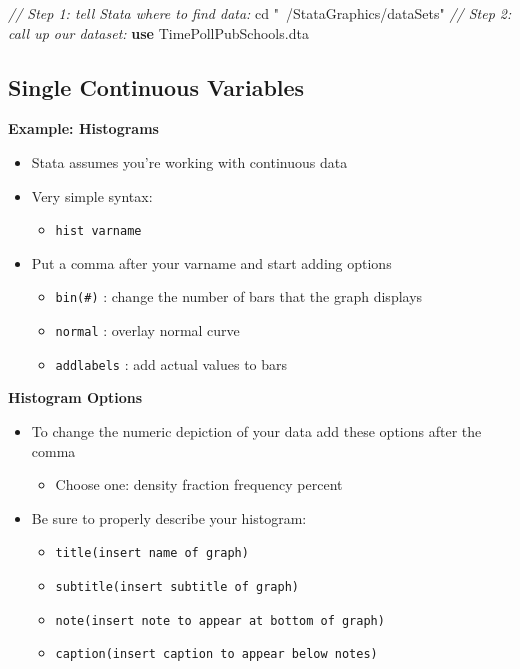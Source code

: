 \documentclass[
]{book}
\newenvironment{Shaded}{\begin{snugshade}}{\end{snugshade}}
\newcommand{\CommentTok}[1]{\textcolor[rgb]{0.56,0.35,0.01}{\textit{#1}}}
\newcommand{\KeywordTok}[1]{\textcolor[rgb]{0.13,0.29,0.53}{\textbf{#1}}}
\newcommand{\NormalTok}[1]{#1}
\newcommand{\StringTok}[1]{\textcolor[rgb]{0.31,0.60,0.02}{#1}}
\providecommand{\tightlist}{%
  \setlength{\itemsep}{0pt}\setlength{\parskip}{0pt}}
\begin{document}
\begin{Shaded}
\begin{Highlighting}[]
  \CommentTok{// Step 1: tell Stata where to find data:}
\NormalTok{  cd }\StringTok{"~/StataGraphics/dataSets"}
  \CommentTok{// Step 2: call up our dataset:}
  \KeywordTok{use}\NormalTok{ TimePollPubSchools.dta}
\end{Highlighting}
\end{Shaded}

\hypertarget{single-continuous-variables}{%
\subsection{Single Continuous Variables}\label{single-continuous-variables}}

\textbf{Example: Histograms}

\begin{itemize}
\tightlist
\item
  Stata assumes you're working with continuous data
\item
  Very simple syntax:

  \begin{itemize}
  \tightlist
  \item
    \texttt{hist\ varname}
  \end{itemize}
\item
  Put a comma after your varname and start adding options

  \begin{itemize}
  \tightlist
  \item
    \texttt{bin(\#)} : change the number of bars that the graph displays
  \item
    \texttt{normal} : overlay normal curve
  \item
    \texttt{addlabels} : add actual values to bars
  \end{itemize}
\end{itemize}

\textbf{Histogram Options}

\begin{itemize}
\tightlist
\item
  To change the numeric depiction of your data add these options after the comma

  \begin{itemize}
  \tightlist
  \item
    Choose one: density fraction frequency percent
  \end{itemize}
\item
  Be sure to properly describe your histogram:

  \begin{itemize}
  \tightlist
  \item
    \texttt{title(insert\ name\ of\ graph)}
  \item
    \texttt{subtitle(insert\ subtitle\ of\ graph)}
  \item
    \texttt{note(insert\ note\ to\ appear\ at\ bottom\ of\ graph)}
  \item
    \texttt{caption(insert\ caption\ to\ appear\ below\ notes)}
  \end{itemize}
\end{itemize}
\end{document}
